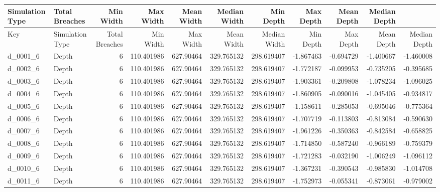 \begin{tabular}{llrrrrrrrrr}
\toprule\textbf{Simulation Type} & \textbf{Total Breaches} & \textbf{Min Width} & \textbf{Max Width} & \textbf{Mean Width} & \textbf{Median Width} & \textbf{Min Depth} & \textbf{Max Depth} & \textbf{Mean Depth} & \textbf{Median Depth}\\ \midrule
     Key & Simulation Type &  Total Breaches &  Min Width &  Max Width &  Mean Width &  Median Width &  Min Depth &  Max Depth &  Mean Depth &  Median Depth \\
\midrule
d_0001_6 &           Depth &               6 & 110.401986 &  627.90464 &  329.765132 &    298.619407 &  -1.867463 &  -0.694729 &   -1.400667 &     -1.460008 \\
d_0002_6 &           Depth &               6 & 110.401986 &  627.90464 &  329.765132 &    298.619407 &  -1.772187 &  -0.099953 &   -0.735205 &     -0.395685 \\
d_0003_6 &           Depth &               6 & 110.401986 &  627.90464 &  329.765132 &    298.619407 &  -1.903361 &  -0.209808 &   -1.078234 &     -1.096025 \\
d_0004_6 &           Depth &               6 & 110.401986 &  627.90464 &  329.765132 &    298.619407 &  -1.860905 &  -0.090016 &   -1.045405 &     -0.934817 \\
d_0005_6 &           Depth &               6 & 110.401986 &  627.90464 &  329.765132 &    298.619407 &  -1.158611 &  -0.285053 &   -0.695046 &     -0.775364 \\
d_0006_6 &           Depth &               6 & 110.401986 &  627.90464 &  329.765132 &    298.619407 &  -1.707719 &  -0.113803 &   -0.813084 &     -0.590630 \\
d_0007_6 &           Depth &               6 & 110.401986 &  627.90464 &  329.765132 &    298.619407 &  -1.961226 &  -0.350363 &   -0.842584 &     -0.658825 \\
d_0008_6 &           Depth &               6 & 110.401986 &  627.90464 &  329.765132 &    298.619407 &  -1.714850 &  -0.587240 &   -0.966189 &     -0.759379 \\
d_0009_6 &           Depth &               6 & 110.401986 &  627.90464 &  329.765132 &    298.619407 &  -1.721283 &  -0.032190 &   -1.006249 &     -1.096112 \\
d_0010_6 &           Depth &               6 & 110.401986 &  627.90464 &  329.765132 &    298.619407 &  -1.367231 &  -0.390543 &   -0.985830 &     -1.014708 \\
d_0011_6 &           Depth &               6 & 110.401986 &  627.90464 &  329.765132 &    298.619407 &  -1.752973 &  -0.055341 &   -0.873061 &     -0.979002 \\

\end{tabular}
